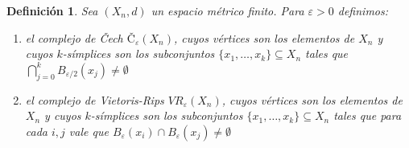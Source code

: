 \documentclass[12pt,a4paper]{article}
\newtheorem{definition}[theorem]{Definición}
\begin{document}
\begin{definition}
    Sea $(X_n, d)$ un espacio métrico finito. Para $\varepsilon > 0$ definimos:
    \begin{enumerate}
        \item el complejo de Čech $Č_\varepsilon(X_n)$, cuyos vértices son los elementos de $X_n$ y cuyos $k$-símplices son los subconjuntos $\{ x_1, \ldots, x_k\} \subseteq X_n$ tales que $\displaystyle \bigcap_{j=0}^k B_{\varepsilon/2}(x_j) \neq \emptyset$
        \item el \textit{complejo de Vietoris-Rips} $VR_\varepsilon(X_n)$, cuyos vértices son los elementos de $X_n$ y cuyos $k$-símplices son los subconjuntos  $\{ x_1, \ldots, x_k\} \subseteq X_n$ tales que para cada $i,j$ vale que $B_{\varepsilon}(x_i) \cap B_{\varepsilon}(x_j) \neq \emptyset$
    \end{enumerate}
\end{definition}
\end{document}
